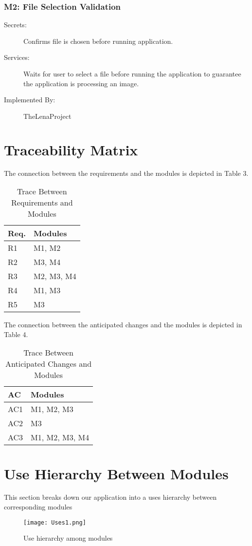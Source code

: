 \documentclass[12pt, titlepage]{article}
\begin{document}
\subsubsection{M2: File Selection Validation}

\begin{description}
	\item[Secrets:]  Confirms file is chosen before running application.
	\item[Services:] Waits for user to select a file before running the application to guarantee the application is processing an image.
	\item[Implemented By:] TheLenaProject
\end{description}

\section{Traceability Matrix} \label{SecTM}

The connection between the requirements and the modules is depicted in Table 3.

\begin{table}[H]
\centering
\begin{tabular}{p{} p{}}
\toprule
\textbf{Req.} & \textbf{Modules}\\
\midrule
R1 & M1, M2 \\
R2 & M3, M4 \\
R3 & M2, M3, M4 \\
R4 & M1, M3 \\
R5 & M3 \\
\bottomrule
\end{tabular}
\caption{Trace Between Requirements and Modules}
\label{TblRT}
\end{table}

The connection between the anticipated changes and the modules is depicted in
Table 4.

\begin{table}[H]
\centering
\begin{tabular}{p{} p{}}
\toprule
\textbf{AC} & \textbf{Modules}\\
\midrule
AC1 & M1, M2, M3\\
AC2 & M3\\
AC3 & M1, M2, M3, M4\\

\bottomrule
\end{tabular}
\caption{Trace Between Anticipated Changes and Modules}
\label{TblACT}
\end{table}

\newpage

\section{Use Hierarchy Between Modules} \label{SecUse}

This section breaks down our application into a uses hierarchy between corresponding modules 

\begin{figure}[H]
\centering
\texttt{[image: Uses1.png]}
\caption{Use hierarchy among modules}
\label{FigUH}
\end{figure}
\end{document}
